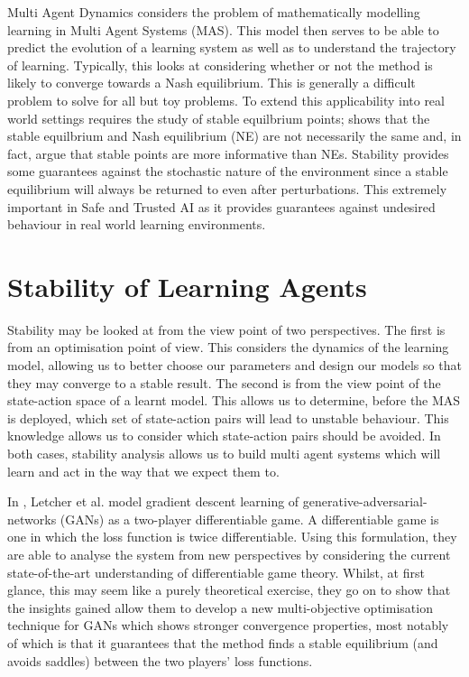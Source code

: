 \documentclass[preprint,11pt]{report}
\begin{document}
Multi Agent Dynamics considers the problem of mathematically modelling learning in Multi Agent
Systems (MAS). This model then serves to be able to predict the evolution of a learning system as
well as to understand the trajectory of learning. Typically, this looks at considering whether or
not the method is likely to converge towards a Nash equilibrium. This is generally a difficult
problem to solve \cite{ShohamMultiagentFoundations} for all but toy problems. To extend this
applicability into real world settings requires the study of stable equilbrium points;
\cite{Letcher2019DifferentiableMechanics} shows that the stable equilbrium and Nash equilibrium (NE)
are not necessarily the same and, in fact, argue that stable points are more informative than NEs.
Stability provides some guarantees against the stochastic nature of the environment since a stable
equilibrium will always be returned to even after perturbations. This extremely important in Safe
and Trusted AI as it provides guarantees against undesired behaviour in real world learning
environments. 

\section{Stability of Learning Agents}

Stability may be looked at from the view point of two perspectives. The first is from an
optimisation point of view. This considers the dynamics of the learning model, allowing us to better
choose our parameters and design our models so that they may converge to a stable result. The second
is from the view point of the state-action space of a learnt model. This allows us to determine,
before the MAS is deployed, which set of state-action pairs will lead to unstable behaviour. This
knowledge allows us to consider which state-action pairs should be avoided. In both cases, stability
analysis allows us to build multi agent systems which will learn and act in the way that we expect
them to.

In \cite{Letcher2019DifferentiableMechanics}, Letcher et al. model gradient descent learning of
generative-adversarial-networks (GANs) as a two-player differentiable game. A differentiable game is
one in which the loss function is twice differentiable. Using this formulation, they are able to
analyse the system from new perspectives by considering the current state-of-the-art understanding
of differentiable game theory. Whilst, at first glance, this may seem like a purely theoretical
exercise, they go on to show that the insights gained allow them to develop a new multi-objective
optimisation technique for GANs which shows stronger convergence properties, most notably of which
is that it guarantees that the method finds a stable equilibrium (and avoids saddles) between the
two players' loss functions.
\end{document}
